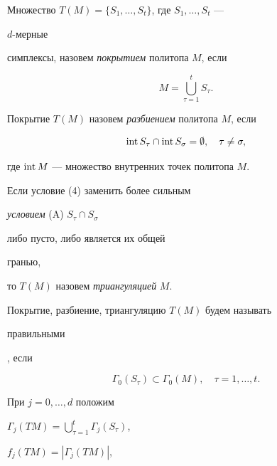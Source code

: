 \begin{defn}


Множество $T(M)=\{S_1,\dotsc,S_t\}$, где $S_1,\dotsc,S_t$ ---


$d$-мерные


симплексы, назовем {\em покрытием} политопа $M$, если


\begin{equation}


M=\bigcup^t_{\tau=1}S_\tau.


\end{equation}


Покрытие $T(M)$ назовем {\em разбиением} политопа $M$, если


\begin{equation}


\Int S_\tau\cap\Int S_\sigma=\emptyset,\quad \tau\ne \sigma,


\end{equation}


\newpage\noindent где $\operatorname{int} M$ --- множество внутренних точек политопа $M$.


Если условие (4) заменить более сильным





{\em условием} (A) $S_\tau\cap S_\sigma$


либо пусто, либо является их общей


гранью,





\noindent то $T(M)$ назовем {\em триангуляцией} $M$.





Покрытие, разбиение, триангуляцию $T(M)$ будем называть {\em


правильными}, если


\begin{equation}


\Gamma_0(S_\tau)\subset\Gamma_0(M),\quad \tau=1,\dotsc,t.


\end{equation}


\end{defn}





При $j=0,\dotsc,d$ положим


$\Gamma_j(TM)=\bigcup\limits^t_{\tau=1}\Gamma_j(S_\tau)$,


$f_j(TM)=|\Gamma_j(TM)|$,


